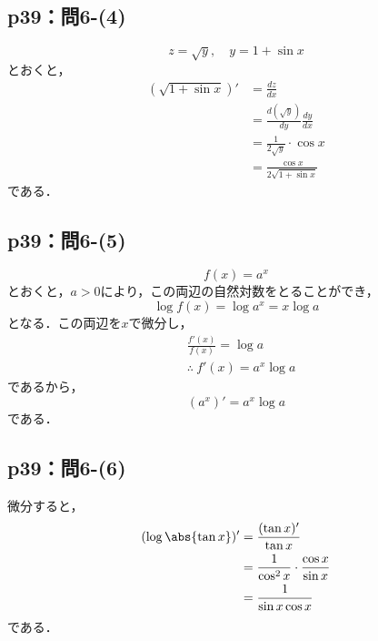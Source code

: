 \documentclass[uplatex,dvipdfmx,a4paper,10pt,fleqn]{jsarticle}
\begin{document}
\subsection*{p39：問6-(4)}


\begin{tleftbar}
    \[
        z = \sqrt{y} , \quad y = 1+\sin x 
    \]
    とおくと，
    \begin{align*} 
        (\sqrt{1+\sin x}) '  &= \frac{dz}{dx} \\
        & = \frac{d (\sqrt{y})}{dy} \frac{dy}{dx}\\
        &= \frac{1}{2\sqrt{y}}\cdot \cos x  \\
        & = \frac{\cos x}{2\sqrt{1+\sin x}}
    \end{align*}
    である．
\end{tleftbar}

\subsection*{p39：問6-(5)}


\begin{tleftbar}
    \[
        f(x)=a^x
    \]
    とおくと，$a>0$により，この両辺の自然対数をとることができ，
    \[
        \log f(x) = \log a^x = x\log a 
    \]
    となる．この両辺を$x$で微分し，
    \begin{align*} 
        & \frac{f'(x)}{f(x)} = \log a \\
        & \therefore ~ f'(x)= a^x \log a 
    \end{align*} 
    であるから，
    \[
        (a^x)' = a^x \log a
    \]
    である．
\end{tleftbar}

\subsection*{p39：問6-(6)}

\begin{tleftbar}
    微分すると，
    \begin{align*} 
        (\log \abs{\tan x} )' & = \frac{(\tan x)'}{\tan x} \\
        & = \frac{1}{\cos ^2 x} \cdot \frac{ \cos x}{\sin x} \\
        & = \frac{1}{\sin x \cos x}
    \end{align*} 
    である．
    \end{tleftbar}
\end{document}

